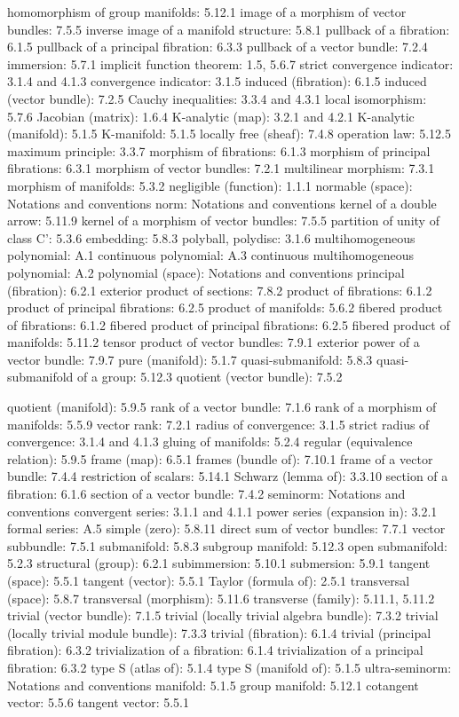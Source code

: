 homomorphism of group manifolds: 5.12.1 image of a morphism of vector bundles: 7.5.5 inverse image of a manifold structure: 5.8.1 pullback of a fibration: 6.1.5 pullback of a principal fibration: 6.3.3 pullback of a vector bundle: 7.2.4 immersion: 5.7.1 implicit function theorem: 1.5, 5.6.7 strict convergence indicator: 3.1.4 and 4.1.3 convergence indicator: 3.1.5 induced (fibration): 6.1.5 induced (vector bundle): 7.2.5 Cauchy inequalities: 3.3.4 and 4.3.1 local isomorphism: 5.7.6 Jacobian (matrix): 1.6.4 K-analytic (map): 3.2.1 and 4.2.1 K-analytic (manifold): 5.1.5 K-manifold: 5.1.5 locally free (sheaf): 7.4.8 operation law: 5.12.5 maximum principle: 3.3.7 morphism of fibrations: 6.1.3 morphism of principal fibrations: 6.3.1 morphism of vector bundles: 7.2.1 multilinear morphism: 7.3.1 morphism of manifolds: 5.3.2 negligible (function): 1.1.1 normable (space): Notations and conventions norm: Notations and conventions kernel of a double arrow: 5.11.9 kernel of a morphism of vector bundles: 7.5.5 partition of unity of class C': 5.3.6 embedding: 5.8.3 polyball, polydisc: 3.1.6 multihomogeneous polynomial: A.1 continuous polynomial: A.3 continuous multihomogeneous polynomial: A.2 polynomial (space): Notations and conventions principal (fibration): 6.2.1 exterior product of sections: 7.8.2 product of fibrations: 6.1.2 product of principal fibrations: 6.2.5 product of manifolds: 5.6.2 fibered product of fibrations: 6.1.2 fibered product of principal fibrations: 6.2.5 fibered product of manifolds: 5.11.2 tensor product of vector bundles: 7.9.1 exterior power of a vector bundle: 7.9.7 pure (manifold): 5.1.7 quasi-submanifold: 5.8.3 quasi-submanifold of a group: 5.12.3 quotient (vector bundle): 7.5.2

quotient (manifold): 5.9.5 rank of a vector bundle: 7.1.6 rank of a morphism of manifolds: 5.5.9 vector rank: 7.2.1 radius of convergence: 3.1.5 strict radius of convergence: 3.1.4 and 4.1.3 gluing of manifolds: 5.2.4 regular (equivalence relation): 5.9.5 frame (map): 6.5.1 frames (bundle of): 7.10.1 frame of a vector bundle: 7.4.4 restriction of scalars: 5.14.1 Schwarz (lemma of): 3.3.10 section of a fibration: 6.1.6 section of a vector bundle: 7.4.2 seminorm: Notations and conventions convergent series: 3.1.1 and 4.1.1 power series (expansion in): 3.2.1 formal series: A.5 simple (zero): 5.8.11 direct sum of vector bundles: 7.7.1 vector subbundle: 7.5.1 submanifold: 5.8.3 subgroup manifold: 5.12.3 open submanifold: 5.2.3 structural (group): 6.2.1 subimmersion: 5.10.1 submersion: 5.9.1 tangent (space): 5.5.1 tangent (vector): 5.5.1 Taylor (formula of): 2.5.1 transversal (space): 5.8.7 transversal (morphism): 5.11.6 transverse (family): 5.11.1, 5.11.2 trivial (vector bundle): 7.1.5 trivial (locally trivial algebra bundle): 7.3.2 trivial (locally trivial module bundle): 7.3.3 trivial (fibration): 6.1.4 trivial (principal fibration): 6.3.2 trivialization of a fibration: 6.1.4 trivialization of a principal fibration: 6.3.2 type S (atlas of): 5.1.4 type S (manifold of): 5.1.5 ultra-seminorm: Notations and conventions manifold: 5.1.5 group manifold: 5.12.1 cotangent vector: 5.5.6 tangent vector: 5.5.1


